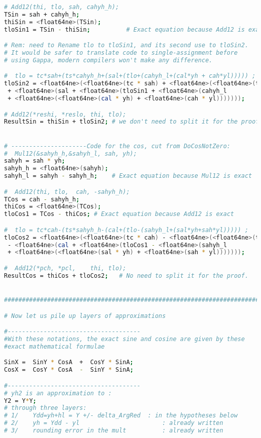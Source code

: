 \begin{lstlisting}[caption={Gappa input to compute the error of DoSineNotZero},
  language={sh}, numbers=none]
# Add12(thi, tlo, sah, cahyh_h);
TSin = sah + cahyh_h;
thiSin = <float64ne>(TSin);
tloSin1 = TSin - thiSin;          # Exact equation because Add12 is exact

# Rem: need to Rename tlo to tloSin1, and its second use to tloSin2.
# It would be safer to translate code to single-assignment before
# using Gappa, modern compilers won't make any difference.

#  tlo = tc*sah+(ts*cahyh_h+(sal+(tlo+(cahyh_l+(cal*yh + cah*yl))))) ;
tloSin2 = <float64ne>(<float64ne>(tc * sah) + <float64ne>(<float64ne>(ts * cahyh_h)
 + <float64ne>(sal + <float64ne>(tloSin1 + <float64ne>(cahyh_l
 + <float64ne>(<float64ne>(cal * yh) + <float64ne>(cah * yl)))))));

# Add12(*reshi, *reslo, thi, tlo);
ResultSin = thiSin + tloSin2; # we don't need to split it for the proof.


# ---------------------Code for the cos, cut from DoCosNotZero: 
#  Mul12(&sahyh_h,&sahyh_l, sah, yh);			            
sahyh = sah * yh;
sahyh_h = <float64ne>(sahyh);
sahyh_l = sahyh - sahyh_h;    # Exact equation because Mul12 is exact

#  Add12(thi, tlo,  cah, -sahyh_h);			            
TCos = cah - sahyh_h;
thiCos = <float64ne>(TCos);
tloCos1 = TCos - thiCos; # Exact equation because Add12 is exact

#  tlo = tc*cah-(ts*sahyh_h-(cal+(tlo-(sahyh_l+(sal*yh+sah*yl))))) ; 
tloCos2 = <float64ne>(<float64ne>(tc * cah) - <float64ne>(<float64ne>(ts * sahyh_h)
 - <float64ne>(cal + <float64ne>(tloCos1 - <float64ne>(sahyh_l
 + <float64ne>(<float64ne>(sal * yh) + <float64ne>(sah * yl)))))));

#  Add12(*pch, *pcl,    thi, tlo);                                   
ResultCos = thiCos + tloCos2;   # No need to split it for the proof.


#######################################################################

# Now let us pile up layers of approximations

#------------------------------------- 
#With these notations, the exact sine and cosine are given by these
#exact mathematical formulae

SinX =  SinY * CosA  +  CosY * SinA;
CosX =  CosY * CosA  -  SinY * SinA;

#-------------------------------------
# yh2 is an approximation to :
Y2 = Y*Y;
# through three layers: 
# 1/    Ydd=yh+hl = Y +/- delta_ArgRed  : in the hypotheses below
# 2/    yh = Ydd - yl                       : already written
# 3/    rounding error in the mult          : already written       


\end{lstlisting}
